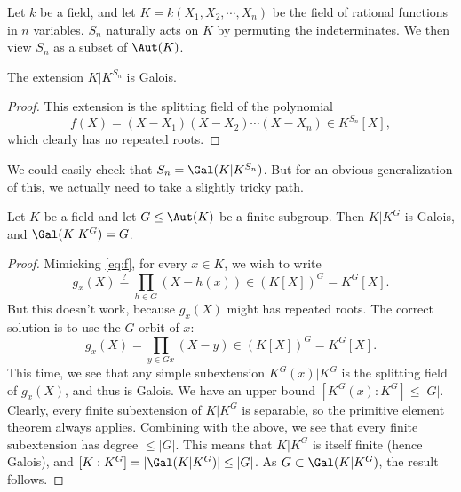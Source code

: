 \documentclass{article}
\begin{document}
\self

Let $k$ be a field, and let $K=k(X_1,X_2,\cdots,X_n)$ be the field of rational functions in $n$ variables. $S_n$ naturally acts on $K$ by permuting the indeterminates. We then view $S_n$ as a subset of $\Aut(K)$.

\begin{lemma}
    The extension $K\vert K^{S_n}$ is Galois.
\end{lemma}

\begin{proof}
    This extension is the splitting field of the polynomial
    \begin{equation}\label{eq:f}
        f(X) = (X-X_1)(X-X_2)\cdots(X-X_n) \in K^{S_n}[X],
    \end{equation}
    which clearly has no repeated roots.
\end{proof}

We could easily check that $S_n=\Gal(K\vert K^{S_n})$. But for an obvious generalization of this, we actually need to take a slightly tricky path.

\begin{theorem}\label{thm.K^G}
    Let $K$ be a field and let $G\leq\Aut(K)$ be a finite subgroup. Then $K\vert K^G$ is Galois, and $\Gal(K\vert K^G)=G$.
\end{theorem}

\begin{proof}
    Mimicking \eqref{eq:f}, for every $x\in K$, we wish to write
    \begin{equation*}
        g_x(X) \overset{?}{=} \prod_{h\in G}(X-h(x)) \in (K[X])^G=K^G[X].
    \end{equation*}
    But this doesn't work, because $g_x(X)$ might has repeated roots. The correct solution is to use the $G$-orbit of $x$:
    \begin{equation*}
        g_x(X) = \prod_{y\in Gx}(X-y) \in (K[X])^G=K^G[X].
    \end{equation*}
    This time, we see that any simple subextension $K^G(x)\vert K^G$ is the splitting field of $g_x(X)$, and thus is Galois. We have an upper bound $[K^G(x):K^G] \leq \vert G\vert$. Clearly, every finite subextension of $K\vert K^G$ is separable, so the primitive element theorem always applies. Combining with the above, we see that every finite subextension has degree $\leq \vert G\vert$. This means that $K\vert K^G$ is itself finite (hence Galois), and $[K:K^G] = \vert\Gal(K\vert K^G)\vert \leq \vert G\vert$. As $G\subset\Gal(K\vert K^G)$, the result follows.
\end{proof}
\end{document}

